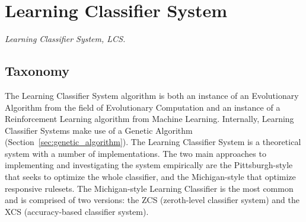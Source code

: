 

\section{Learning Classifier System} 
\label{sec:learning_classifier_system}

\emph{Learning Classifier System, LCS.}

\subsection{Taxonomy}
The Learning Classifier System algorithm is both an instance of an Evolutionary Algorithm from the field of Evolutionary Computation and an instance of a Reinforcement Learning algorithm from Machine Learning. Internally, Learning Classifier Systems make use of a Genetic Algorithm (Section~\ref{sec:genetic_algorithm}).
The Learning Classifier System is a theoretical system with a number of implementations. The two main approaches to implementing and investigating the system empirically are the Pittsburgh-style that seeks to optimize the whole classifier, and the Michigan-style that optimize responsive rulesets. 
The Michigan-style Learning Classifier is the most common and is comprised of two versions: the ZCS (zeroth-level classifier system) and the XCS (accuracy-based classifier system).

